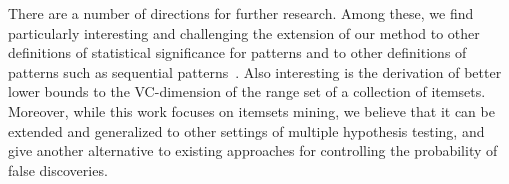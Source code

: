 There are a number of directions for further research. Among these, we find
particularly interesting and challenging the extension of our method to other
definitions of statistical significance for patterns and to other definitions of
patterns such as sequential patterns~\citep{LowCamRKP13}. %
Also interesting is the derivation of better lower bounds to the VC-dimension
of the range set of a collection of itemsets. Moreover, while this work focuses
on itemsets mining, we believe that it can be extended and generalized to other
settings of multiple hypothesis testing, and give another alternative to existing
approaches for controlling the probability of false discoveries. %


